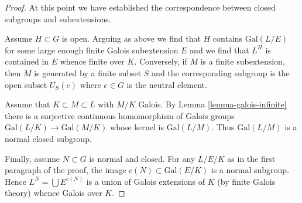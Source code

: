 \documentclass[10pt,a4paper]{amsart}
\theoremstyle{plain}
\theoremstyle{definition}
\theoremstyle{remark}
\numberwithin{equation}{subsection}
\begin{document}
\begin{proof}
\medskip\noindent
At this point we have established the correspondence between closed
subgroups and subextensions.

\medskip\noindent
Assume $H \subset G$ is open. Arguing as above we find that
$H$ contains $\text{Gal}(L/E)$ for some large enough finite
Galois subextension $E$ and we find that $L^H$ is contained
in $E$ whence finite over $K$. Conversely, if $M$ is a finite
subextension, then $M$ is generated by a finite subset $S$
and the corresponding subgroup is the open subset $U_S(e)$
where $e \in G$ is the neutral element.

\medskip\noindent
Assume that $K \subset M \subset L$ with $M/K$ Galois.
By Lemma \ref{lemma-galois-infinite} there is a surjective
continuous homomorphism of Galois groups
$\text{Gal}(L/K) \to \text{Gal}(M/K)$ whose
kernel is $\text{Gal}(L/M)$. Thus $\text{Gal}(L/M)$ is a normal
closed subgroup.

\medskip\noindent
Finally, assume $N \subset G$ is normal and closed. For any
$L/E/K$ as in the first paragraph of the proof, the image
$c(N) \subset \text{Gal}(E/K)$ is a normal subgroup.
Hence $L^N = \bigcup E^{c(N)}$ is a union of Galois extensions
of $K$ (by finite Galois theory) whence Galois over $K$.
\end{proof}



\end{document}
